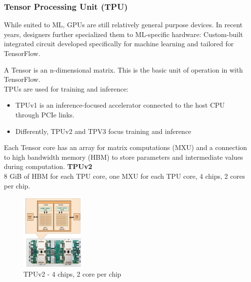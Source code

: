 \documentclass[10pt, oneside]{article}
\begin{document}
\subsubsection{Tensor Processing Unit (TPU)}
While suited to ML, GPUs are still relatively general purpose devices. In recent years, designers further specialized them to ML-specific hardware: Custom-built integrated circuit developed specifically for machine learning and tailored for TensorFlow.\\
\begin{multicols}{2}
    A Tensor is an n-dimensional matrix. This is the basic unit of operation in with TensorFlow.\\TPUs are used for training and inference:
\begin{itemize}
    \item TPUv1 is an inference-focused accelerator connected to the host CPU through PCIe links.
    \item Differently, TPUv2 and TPV3 focus training and inference
\end{itemize}
    Each Tensor core has an array for matrix computations (MXU) and a connection to high bandwidth memory (HBM) to store parameters and intermediate values during computation.
    \textbf{TPUv2}
    \\
    8 GiB of HBM for each TPU core, one MXU for each TPU core, 4 chips, 2 cores per chip.
    \columnbreak
    \noindent
    \begin{figure}[H]
        \begin{center}
        \includegraphics[width=0.28\textwidth]{img/img10.png}
        \caption{TPUv2 - 4 chips, 2 core per chip}
        \label{fig:TPUv2 - 4 chips, 2 core per chip}
        \end{center}
    \end{figure} 
\end{multicols}
\end{document}
